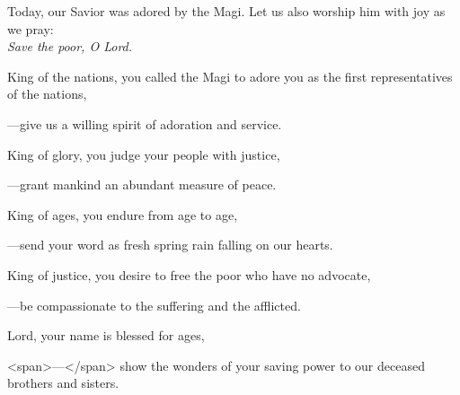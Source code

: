 \intercessions\indent

\begin{hangpar}

Today, our Savior was adored by the Magi. Let us also worship him with joy as we pray:\\
\emph{Save the poor, O Lord.}

\medskip King of the nations, you called the Magi to adore you as the first representatives of the nations,

{\color{red}---\thinspace}give us a willing spirit of adoration and service.

\medskip King of glory, you judge your people with justice,

{\color{red}---\thinspace}grant mankind an abundant measure of peace.

\medskip King of ages, you endure from age to age,

{\color{red}---\thinspace}send your word as fresh spring rain falling on our hearts.

\medskip King of justice, you desire to free the poor who have no advocate,

{\color{red}---\thinspace}be compassionate to the suffering and the afflicted.

\medskip Lord, your name is blessed for ages,

<span>—</span> show the wonders of your saving power to our deceased brothers and sisters.

\medskip

\end{hangpar}